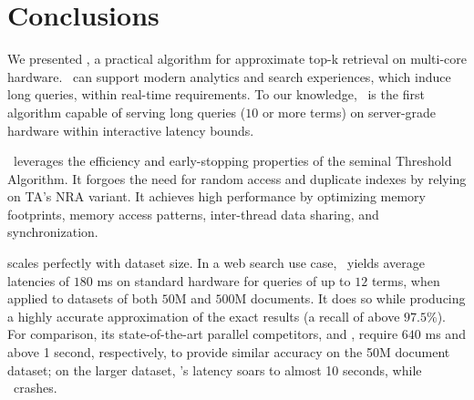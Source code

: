 \section{Conclusions}
\label{sec:conclusions}

We presented \alg, a practical algorithm for approximate top-k retrieval on multi-core hardware. 
\alg\ can support modern analytics and search experiences, which induce long queries, within real-time  requirements. 
To our knowledge, \alg\ is the first algorithm capable of serving  long queries ($10$ or more terms)
on server-grade hardware
within interactive latency bounds.



\alg\ leverages the efficiency and early-stopping properties of the seminal Threshold Algorithm. 
It forgoes the need for random access and duplicate indexes by relying on  TA's 
NRA variant. 
It achieves high performance by 
optimizing memory footprints, memory access patterns, inter-thread data sharing, and synchronization.  

\alg\/ scales perfectly with dataset size. In a web search use case, \alg\ yields average latencies of  $180$ ms on standard hardware for queries of up to $12$ terms,  
when applied to datasets of both $50$M and $500$M documents. 
It does so while producing a highly accurate approximation of the exact results (a recall of above $97.5\%$). 
For comparison, its state-of-the-art parallel competitors, \pBMW\/ and \pJASS,  
require $640$ ms and above 1 second, respectively, to provide similar accuracy on the 50M document dataset;
on the larger dataset,  \pBMW's latency soars to almost 10 seconds, while \pJASS\ crashes. 


